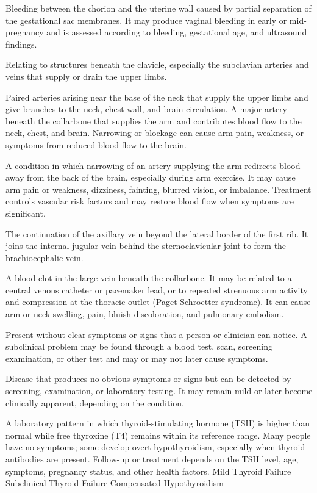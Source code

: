  Bleeding between the chorion and the uterine wall caused by partial separation of the gestational sac membranes. It may produce vaginal bleeding in early or mid-pregnancy and is assessed according to bleeding, gestational age, and ultrasound findings.

 Relating to structures beneath the clavicle, especially the subclavian arteries and veins that supply or drain the upper limbs.

 Paired arteries arising near the base of the neck that supply the upper limbs and give branches to the neck, chest wall, and brain circulation.
 A major artery beneath the collarbone that supplies the arm and contributes blood flow to the neck, chest, and brain. Narrowing or blockage can cause arm pain, weakness, or symptoms from reduced blood flow to the brain.

 A condition in which narrowing of an artery supplying the arm redirects blood away from the back of the brain, especially during arm exercise. It may cause arm pain or weakness, dizziness, fainting, blurred vision, or imbalance. Treatment controls vascular risk factors and may restore blood flow when symptoms are significant.

 The continuation of the axillary vein beyond the lateral border of the first rib. It
joins the internal jugular vein behind the sternoclavicular joint to form the
brachiocephalic vein.

 A blood clot in the large vein beneath the collarbone. It may be related to a central venous catheter or pacemaker lead, or to repeated strenuous arm activity and compression at the thoracic outlet (Paget-Schroetter syndrome). It can cause arm or neck swelling, pain, bluish discoloration, and pulmonary embolism.

 Present without clear symptoms or signs that a person or clinician can notice. A subclinical problem may be found through a blood test, scan, screening examination, or other test and may or may not later cause symptoms.

 Disease that produces no obvious symptoms or signs but can be detected by screening, examination, or laboratory testing. It may remain mild or later become clinically apparent, depending on the condition.

 A laboratory pattern in which thyroid-stimulating hormone (TSH) is higher than normal while free thyroxine (T4) remains within its reference range. Many people have no symptoms; some develop overt hypothyroidism, especially when thyroid antibodies are present. Follow-up or treatment depends on the TSH level, age, symptoms, pregnancy status, and other health factors.
\synonyms
Mild Thyroid Failure
Subclinical Thyroid Failure
Compensated Hypothyroidism

